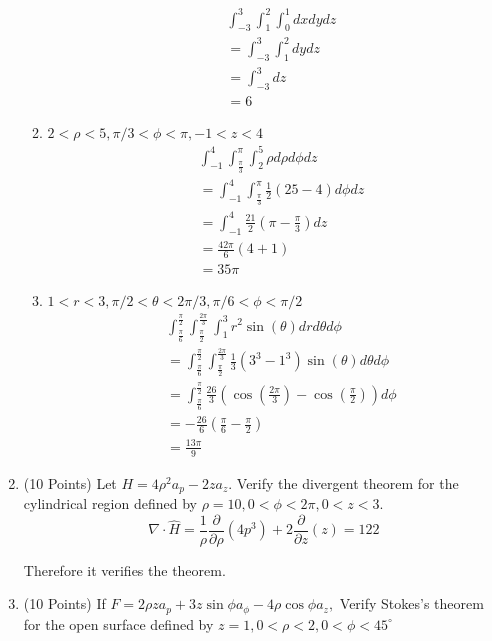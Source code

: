 \documentclass{article}
\begin{document}
\begin{enumerate}
\begin{enumerate}
\begin{align}
            &\int_{-3}^3\int_1^2\int_0^1dxdydz\\
            &=\int_{-3}^3\int_1^2dydz\\
            &=\int_{-3}^3dz\\
            &=\boxed{6}
        \end{align}
        \item $2 < \rho < 5, \pi/3 < \phi < \pi, -1 < z < 4$
        \begin{align}
            &\int_{-1}^4\int_\frac{\pi}{3}^\pi\int_2^5 \rho d\rho d\phi dz\\
            &=\int_{-1}^4\int_\frac{\pi}{3}^\pi\frac{1}{2}(25-4) d\phi dz\\
            &=\int_{-1}^4\frac{21}{2}(\pi-\frac{\pi}{3})dz\\
            &=\frac{42\pi}{6}(4+1)\\
            &=\boxed{35\pi}
        \end{align}
        \item $1 < r < 3, \pi/2 < \theta < 2\pi/3,\pi/6 < \phi < \pi/2$
        \begin{align}
            &\int_\frac{\pi}{6}^\frac{\pi}{2}\int_\frac{\pi}{2}^\frac{2\pi}{3}\int_1^3 r^2\sin(\theta)drd\theta d\phi\\
            &=\int_\frac{\pi}{6}^\frac{\pi}{2}\int_\frac{\pi}{2}^\frac{2\pi}{3} \frac{1}{3}(3^3-1^3)\sin(\theta)d\theta d\phi\\
            &=\int_\frac{\pi}{6}^\frac{\pi}{2} \frac{26}{3}(\cos(\frac{2\pi}{3})-\cos(\frac{\pi}{2}))d\phi\\
            &=-\frac{26}{6}(\frac{\pi}{6}-\frac{\pi}{2})\\
            &= \boxed{\frac{13\pi}{9}}
        \end{align}
    \end{enumerate}
    \newpage
    \item (10 Points) Let $H = 4\rho^2a_p - 2za_z.$ Verify the divergent theorem for the cylindrical region defined by $\rho = 10, 0 < \phi < 2\pi, 0 < z < 3.$
    \begin{equation}
        \nabla \cdot \hat{H} = \frac{1}{\rho}\frac{\partial}{\partial\rho}(4p^3)+2\frac{\partial}{\partial z}(z) = 122
    \end{equation}
    \begin{center}
        Therefore it verifies the theorem.
    \end{center}
    \newpage
    \item (10 Points) If $F = 2\rho za_p+3z\sin\phi a_\phi-4\rho\cos\phi a_z,$ Verify Stokes's theorem for the open surface defined by $z = 1, 0 < \rho < 2, 0 < \phi < 45^\circ$

\end{enumerate}
\end{document}
